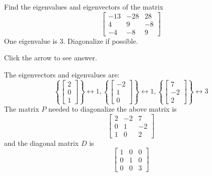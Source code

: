 \documentclass{ximera}
\begin{document}
\begin{problem}\label{prb:8.21} Find the eigenvalues and eigenvectors of the matrix
\begin{equation*}
\left[
\begin{array}{rrr}
-13 & -28 & 28 \\
4 & 9 & -8 \\
-4 & -8 & 9
\end{array}
\right]
\end{equation*}
One eigenvalue is $3.$ Diagonalize if possible.

Click the arrow to see answer.
\begin{expandable}
The eigenvectors and eigenvalues are:
\[
\left\{ \left[
\begin{array}{c}
2 \\
0 \\
1
\end{array}
\right] \right\} \leftrightarrow 1, \left\{ \left[
\begin{array}{c}
-2 \\
1 \\
0
\end{array}
\right] \right\} \leftrightarrow 1, \left\{ \left[
\begin{array}{c}
7 \\
-2 \\
2
\end{array}
\right] \right\} \leftrightarrow 3
\]
The matrix $P$ needed to diagonalize the above matrix is
\[
\left[
\begin{array}{rrr}
2 & -2 & 7 \\
0 & 1 & -2 \\
1 & 0 & 2
\end{array}
\right]
\]
and the diagonal matrix $D$ is
\[
\left[
\begin{array}{rrr}
1 & 0 & 0  \\
0 & 1 & 0 \\
0 & 0 & 3
\end{array}
\right]
\]
\end{expandable}
\end{problem}
\end{document}
